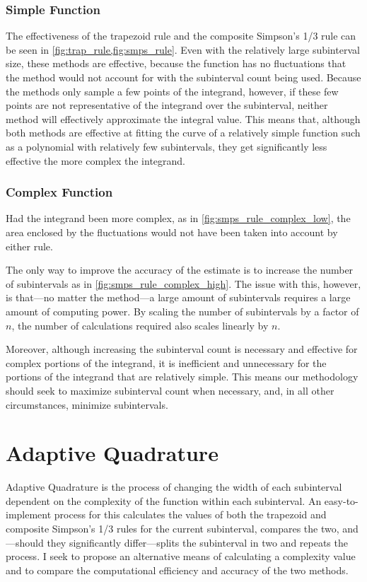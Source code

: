 \documentclass{paper}
\begin{document}
\subsubsection{Simple Function}
\label{sec:simple}
The effectiveness of the trapezoid rule and the composite Simpson's 1/3 rule can be seen in \cref{fig:trap_rule,fig:smps_rule}.
Even with the relatively large subinterval size, these methods are effective, because the function has no fluctuations that the method would not account for with the subinterval count being used.
Because the methods only sample a few points of the integrand, however, if these few points are not representative of the integrand over the subinterval, neither method will effectively approximate the integral value.
This means that, although both methods are effective at fitting the curve of a relatively simple function such as a polynomial with relatively few subintervals, they get significantly less effective the more complex the integrand.

\subsubsection{Complex Function}
\label{sec:complex_examples}
Had the integrand been more complex, as in \cref{fig:smps_rule_complex_low}, the area enclosed by the fluctuations would not have been taken into account by either rule.
%

%
The only way to improve the accuracy of the estimate is to increase the number of subintervals as in \cref{fig:smps_rule_complex_high}.
The issue with this, however, is that---no matter the method---a large amount of subintervals requires a large amount of computing power.
By scaling the number of subintervals by a factor of \(n\), the number of calculations required also scales linearly by \(n\).
%

%
Moreover, although increasing the subinterval count is necessary and effective for complex portions of the integrand, it is inefficient and unnecessary for the portions of the integrand that are relatively simple.
This means our methodology should seek to maximize subinterval count when necessary, and, in all other circumstances, minimize subintervals.

\section{Adaptive Quadrature}
\label{sec:adaptive}
Adaptive Quadrature is the process of changing the width of each subinterval dependent on the complexity of the function within each subinterval.
An easy-to-implement process for this calculates the values of both the trapezoid and composite Simpson's 1/3 rules for the current subinterval, compares the two, and---should they significantly differ---splits the subinterval in two and repeats the process.\autocite[p. 1]{established}
I seek to propose an alternative means of calculating a complexity value and to compare the computational efficiency and accuracy of the two methods.
\end{document}
